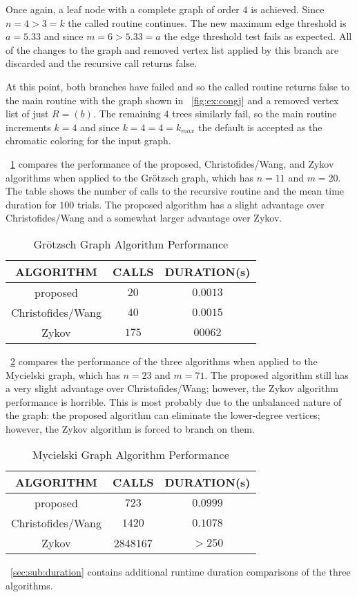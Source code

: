 Once again, a leaf node with a complete graph of order \(4\) is achieved.  Since \(n=4>3=k\) the called routine
continues.  The new maximum edge threshold is \(a=5.33\) and since \(m=6>5.33=a\) the edge threshold test fails as
expected.  All of the changes to the graph and removed vertex list applied by this branch are discarded and the
recursive call returns false.

At this point, both branches have failed and so the called routine returns false to the main routine with the graph
shown in \figurename~\ref{fig:ex:congj} and a removed vertex list of just \(R=(b)\).  The remaining \(4\) trees
similarly fail, so the main routine increments \(k=4\) and since \(k=4=4=k_{max}\) the default  is
accepted as the chromatic coloring for the input graph.

\tablename~\ref{tab:ex:results} compares the performance of the proposed, Christofides/Wang, and Zykov algorithms
when applied to the Gr\"{o}tzsch graph, which has \(n=11\) and \(m=20\).  The table shows the number of calls to
the recursive routine and the mean time duration for \(100\) trials.  The proposed algorithm has a slight advantage
over Christofides/Wang and a somewhat larger advantage over Zykov.

\begin{table}[H]
  \centering
  \caption{Gr\"{o}tzsch Graph Algorithm Performance}
  \label{tab:ex:results}
  \begin{tabular}{|c|c|c|}
    \hline
    ALGORITHM & CALLS & DURATION(s) \\
    \hline
    proposed & \(20\) & \(0.0013\) \\
    \hline
    Christofides/Wang & \(40\) & \(0.0015\) \\
    \hline
    Zykov & \(175\) & \(00062\) \\
    \hline
  \end{tabular}
\end{table}

\tablename~\ref{tab:ex:results2} compares the performance of the three algorithms when applied to the 
Mycielski graph, which has \(n=23\) and \(m=71\). The proposed algorithm still has a very slight advantage over
Christofides/Wang; however, the Zykov algorithm performance is horrible.  This is most probably due to the
unbalanced nature of the graph: the proposed algorithm can eliminate the lower-degree vertices; however, the Zykov
algorithm is forced to branch on them.

\begin{table}[H]
  \centering
  \caption{Mycielski  Graph Algorithm Performance}
  \label{tab:ex:results2}
  \begin{tabular}{|c|c|c|}
    \hline
    ALGORITHM & CALLS & DURATION(s) \\
    \hline
    proposed & \(723\) & \(0.0999\) \\
    \hline
    Christofides/Wang & \(1420\) & \(0.1078\) \\
    \hline
    Zykov & 2848167 & \(>250\) \\
    \hline
  \end{tabular}
\end{table}

\sectionname~\ref{sec:sub:duration} contains additional runtime duration comparisons of the three algorithms.

